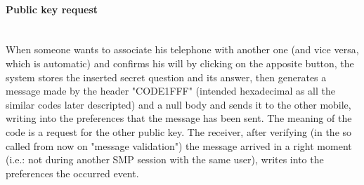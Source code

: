 \paragraph{Public key request} \hspace{0pt} \\
When someone wants to associate his telephone with another one (and vice versa, which is automatic) and confirms his will by clicking on the apposite button, the system stores the inserted secret question and its answer, then generates a message made by the header "CODE1FFF" (intended hexadecimal as all the similar codes later descripted) and a null body and sends it to the other mobile, writing into the preferences that the message has been sent. The meaning of the code is a request for the other public key. The receiver, after verifying (in the so called from now on "message validation") the message arrived in a right moment (i.e.: not during another SMP session with the same user), writes into the preferences the occurred event.